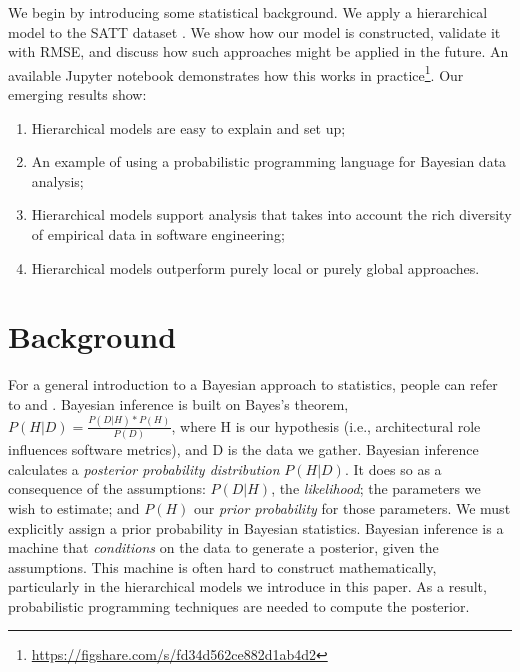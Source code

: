 \documentclass[sigconf,natbib=false]{acmart}
\begin{document}
We begin by introducing some statistical background. 
We apply a hierarchical model to the SATT dataset  \cite{Aniche2016}. We show
how our model is constructed, validate it with RMSE, and discuss how such
approaches might be applied in the future. An available Jupyter notebook
demonstrates how this works in
practice\footnote{\url{https://figshare.com/s/fd34d562ce882d1ab4d2}}.
Our emerging results show:
\begin{enumerate}
	\item Hierarchical models are easy to explain and set up;
	\item An example of using a probabilistic programming language for Bayesian data analysis;
	\item Hierarchical models support analysis that takes into account the rich diversity of empirical data in software engineering;
	\item Hierarchical models outperform purely local or purely global approaches.
\end{enumerate}

\section{Background}
For a general introduction to a Bayesian approach to statistics, people can
refer to \cite{gelman14} and \cite{mcilreath16}. Bayesian inference is built on
Bayes's theorem, $P(H | D) = \frac{ P(D | H) * P(H)}{P(D)}$, where H is our
hypothesis (i.e., architectural role influences software metrics), and D is the
data we gather. Bayesian inference calculates a \emph{posterior probability
distribution} $P(H|D)$. It does so as a consequence of the assumptions: $P(D |
H)$, the \emph{likelihood}; the parameters we wish to estimate; and $P(H)$ our
\emph{prior probability} for those parameters. We must explicitly assign a prior
probability in Bayesian statistics. 
Bayesian inference is a machine that \emph{conditions} on the data to generate a
posterior, given the assumptions. This machine is often hard to construct
mathematically, particularly in the hierarchical models we introduce in this
paper. As a result, probabilistic programming techniques are needed to compute
the posterior. 
\end{document}
